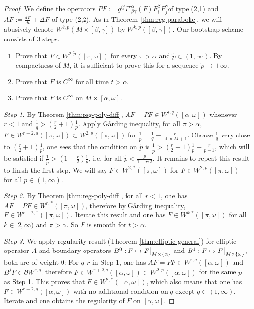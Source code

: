 \begin{proof}
We define the operators \(P F := g^{ij}\Gamma'^\alpha_{\beta\gamma}(F) F^\beta_i
F^\gamma_j\)of type (2,1) and \(A F := \frac{dF }{dt} + \Delta F\) of type (2,2). As in
Theorem \ref{thm:reg-parabolic}, we will abusively denote \(W^{k,p}(M\times
[\beta,\gamma])\) by \(W^{k,p}([\beta,\gamma])\). Our bootstrap scheme consists of 3
steps:
\begin{enumerate}
\item Prove that \(F\in W^{2,\tilde p}([\pi,\omega])\) for every \(\pi > \alpha\) and \(\tilde p \in (1,\infty)\). By
compactness of \(M\), it is sufficient to prove this
for a sequence \(\tilde p \to +\infty\).
\item Prove that \(F\) is \(C^\infty\) for all time \(t >\alpha\).
\item Prove that \(F\) is \(C^\infty\) on \(M\times [\alpha,\omega]\).
\end{enumerate}

\emph{Step 1.} By Theorem \ref{thm:reg-poly-diff}, \(AF = PF \in W^{r,q}([\alpha,\omega])\) whenever \(r<1\) and \(\frac{1}{q} > (\frac{r}{2}+1)\frac{1}{p}\). Apply Gårding inequality, for all
\(\pi >\alpha\), \(F\in W^{r+2,q}([\pi,\omega]) \subset W^{2,\tilde p}([\pi,\omega])\)
for \(\frac{1}{\tilde p} = \frac{1}{q} - \frac{r}{\dim M + 1}\). Choose \(\frac{1}{q}\) very close to \((\frac{r}{2}+1)\frac{1}{p}\), one sees that the condition on \(\tilde p\) is \(\frac{1}{\tilde p } > (\frac{r}{2} +1 ) \frac{1}{p} - \frac{r}{p-1}\),
which will be satisfied if \(\frac{1}{\tilde p} > (1-\frac{r}{2})
\frac{1}{p}\), i.e. for all \(\tilde p < \frac{p}{1 -r/2}\). It remains to repeat this
result to finish the first
step. We will say \(F\in W^{2,*}([\pi,\omega])\) for \(F\in W^{2,p}([\pi,\omega])\) for all \(p\in (1,\infty)\).

\emph{Step 2.} By Theorem \ref{thm:reg-poly-diff}, for all \(r<1\), one has \(AF = PF \in
W^{r,*}([\pi,\omega])\), therefore by Gårding inequality, \(F\in W^{r+2, * }([\pi,\omega])\). Iterate this result and one has \(F\in
W^{k,*}([\pi,\omega])\) for all \(k\in [2,\infty)\) and \(\pi >\alpha\). So \(F\)
is smooth for \(t>\alpha\).

\emph{Step 3.} We apply regularity result (Theorem \ref{thm:elliptic-general}) for elliptic operator \(A\) and boundary
operators \(B^0: F \mapsto \restr{F}{M\times\{\alpha\}}\) and \(B^1: F \mapsto
\restr{F}{M\times\{\omega\}}\), both are of weight \(0\): For \(q,r\) in Step 1,
one has \(AF = PF \in W^{r,q}([\alpha,\omega])\) and \(B^j F \in \partial W^{r,q}\),
therefore \(F\in W^{r+2,q}([\alpha,\omega])\subset W^{2,\tilde p}([\alpha,\omega])\)
for the same \(\tilde p\) as Step 1. This proves that \(F\in W^{2,*}([\alpha,\omega])\), which also means that one has \(F\in W^{r+2,q}([\alpha,\omega])\) with no additional
condition on \(q\) except \(q\in (1,\infty)\). Iterate and one obtains the regularity
of \(F\) on \([\alpha,\omega]\).
\end{proof}

